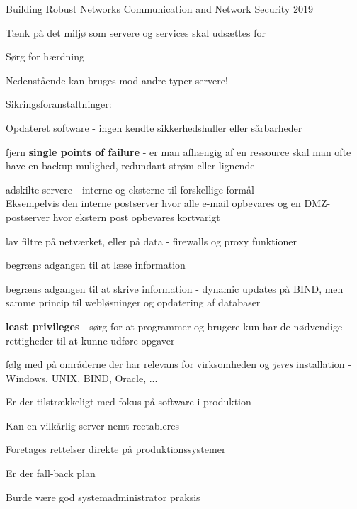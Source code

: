 \documentclass[Screen16to9,17pt]{foils}
\begin{document}
\mytitlepage
{Building Robust Networks}
{Communication and Network Security 2019}



\begin{list1}
\item Tænk på det miljø som servere og services skal udsættes for
\item Sørg for hærdning
\end{list1}

\begin{list1}
  \item Nedenstående kan bruges mod andre typer servere!
\item Sikringsforanstaltninger:
  \begin{list2}
  \item Opdateret software - ingen kendte sikkerhedshuller eller
  sårbarheder
\item fjern {\bfseries single points of failure} - er man afhængig af
  en ressource skal man ofte have en backup mulighed, redundant strøm
  eller lignende
\item adskilte servere - interne og eksterne til forskellige formål\\
Eksempelvis den interne postserver hvor alle e-mail opbevares og en
DMZ-postserver hvor ekstern post opbevares kortvarigt
\item lav filtre på netværket, eller på data - firewalls og proxy
  funktioner
\item begræns adgangen til at læse information
\item begræns adgangen til at skrive information - dynamic updates på
  BIND, men samme princip til webløsninger og opdatering af databaser
\item {\bfseries least privileges} - sørg for at programmer og brugere
  kun har de nødvendige rettigheder til at kunne udføre opgaver
\item følg med på områderne der har relevans for virksomheden og
  \emph{jeres} installation - Windows, UNIX, BIND, Oracle, ...
  \end{list2}
\end{list1}



\begin{list1}
\item Er der tilstrækkeligt med fokus på software i produktion
\item Kan en vilkårlig server nemt reetableres
\item Foretages rettelser direkte på produktionssystemer
\item Er der fall-back plan
\item Burde være god systemadministrator praksis
\end{list1}
\end{document}
